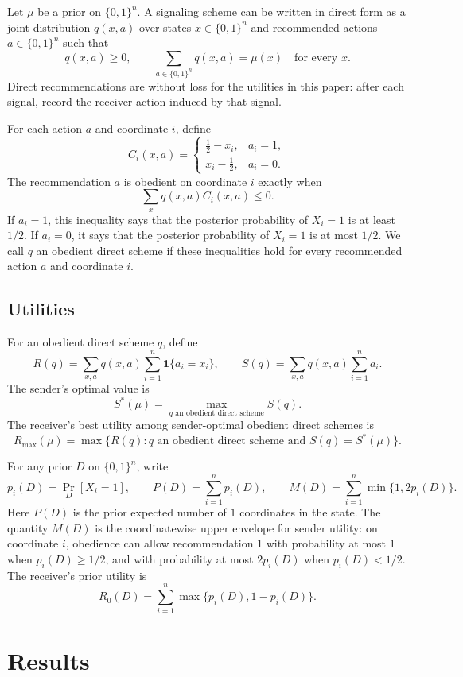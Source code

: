 \documentclass[format=acmsmall, review=false]{acmart}
\begin{document}
Let $\mu$ be a prior on $\{0,1\}^n$. A signaling scheme can be written in direct
form as a joint distribution $q(x,a)$ over states $x\in\{0,1\}^n$ and
recommended actions $a\in\{0,1\}^n$ such that
\[
q(x,a)\geq 0,
\qquad
\sum_{a\in\{0,1\}^n}q(x,a)=\mu(x)
\quad\text{for every }x.
\]
Direct recommendations are without loss for the utilities in this paper: after
each signal, record the receiver action induced by that signal.

For each action $a$ and coordinate $i$, define
\[
C_i(x,a)=
\begin{cases}
\frac12-x_i, & a_i=1,\\
x_i-\frac12, & a_i=0.
\end{cases}
\]
The recommendation $a$ is obedient on coordinate $i$ exactly when
\[
\sum_x q(x,a) C_i(x,a)\leq 0.
\]
If $a_i=1$, this inequality says that the posterior probability of $X_i=1$ is
at least $1/2$. If $a_i=0$, it says that the posterior probability of $X_i=1$
is at most $1/2$.
We call $q$ an obedient direct scheme if these inequalities hold for every
recommended action $a$ and coordinate $i$.

\subsection{Utilities}

For an obedient direct scheme $q$, define
\[
R(q)=\sum_{x,a}q(x,a)\sum_{i=1}^n \mathbf{1}\{a_i=x_i\},
\qquad
S(q)=\sum_{x,a}q(x,a)\sum_{i=1}^n a_i.
\]
The sender's optimal value is
\[
S^*(\mu)=\max_{q\text{ an obedient direct scheme}} S(q).
\]
The receiver's best utility among sender-optimal obedient direct schemes is
\[
R_{\max}(\mu)
=
\max\{R(q):q\text{ an obedient direct scheme and }S(q)=S^*(\mu)\}.
\]

For any prior $D$ on $\{0,1\}^n$, write
\[
p_i(D)=\Pr_D[X_i=1],
\qquad
P(D)=\sum_{i=1}^n p_i(D),
\qquad
M(D)=\sum_{i=1}^n \min\{1,2p_i(D)\}.
\]
Here $P(D)$ is the prior expected number of $1$ coordinates in the state.
The quantity $M(D)$ is the coordinatewise upper envelope for sender utility:
on coordinate $i$, obedience can allow recommendation $1$ with probability at
most $1$ when $p_i(D)\geq 1/2$, and with probability at most $2p_i(D)$ when
$p_i(D)<1/2$.
The receiver's prior utility is
\[
R_0(D)=\sum_{i=1}^n \max\{p_i(D),1-p_i(D)\}.
\]

\section{Results}
\end{document}
